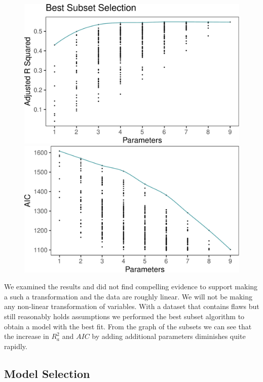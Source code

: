 \documentclass[
  english,
  man,floatsintext]{apa6}
\begin{document}
\begin{figure}
\includegraphics[width=0.5\linewidth]{paper_files/figure-latex/unnamed-chunk-3-1} \includegraphics[width=0.5\linewidth]{paper_files/figure-latex/unnamed-chunk-3-2} \caption{ }\label{fig:unnamed-chunk-3}
\end{figure}

We examined the results and did not find compelling evidence to support making a such a transformation and the data are roughly linear. We will not be making any non-linear transformation of variables. With a dataset that contains flaws but still reasonably holds assumptions we performed the best subset algorithm to obtain a model with the best fit. From the graph of the subsets we can see that the increase in \(R^{2}_a\) and \(AIC\) by adding additional parameters diminishes quite rapidly.

\hypertarget{model-selection}{%
\subsection{Model Selection}\label{model-selection}}
\end{document}

